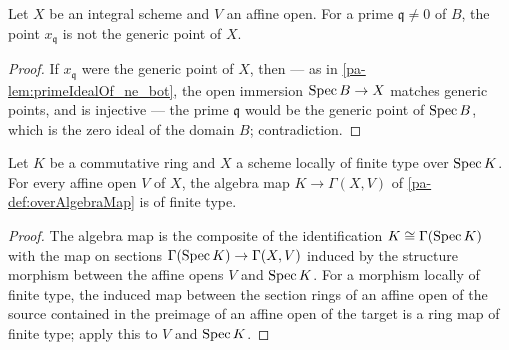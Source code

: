 \begin{lemma}
  \label{pa-lem:fromSpec_base_ne_genericPoint}
  \leanok

  Let \(X\) be an integral scheme and \(V\) an affine open. For a prime
  \(\mathfrak q \neq 0\) of \(B\), the point \(x_{\mathfrak q}\) is not the generic
  point of \(X\).
\end{lemma}
\begin{proof}
  \leanok
  If \(x_{\mathfrak q}\) were the generic point of \(X\), then --- as in
  \ref{pa-lem:primeIdealOf_ne_bot}, the open immersion \(\operatorname{Spec} B \to X\) matches generic
  points, and is injective --- the prime \(\mathfrak q\) would be the generic point of
  \(\operatorname{Spec} B\), which is the zero ideal of the domain \(B\); contradiction.
\end{proof}

\begin{theorem}
  \label{pa-thm:overAlgebraMap_finiteType}
  \leanok

  Let \(K\) be a commutative ring and \(X\) a scheme locally of finite type over
  \(\operatorname{Spec} K\). For every affine open \(V\) of \(X\), the algebra map
  \(K \to \Gamma(X, V)\) of \ref{pa-def:overAlgebraMap} is of finite type.
\end{theorem}
\begin{proof}
  \leanok
  The algebra map is the composite of the identification \(K \cong \Gamma(\operatorname{Spec} K)\)
  with the map on sections \(\Gamma(\operatorname{Spec} K) \to \Gamma(X, V)\) induced by the
  structure morphism between the affine opens \(V\) and \(\operatorname{Spec} K\). For a morphism
  locally of finite type, the induced map between the section rings of an affine open
  of the source contained in the preimage of an affine open of the target is a ring
  map of finite type; apply this to \(V\) and \(\operatorname{Spec} K\).
\end{proof}

